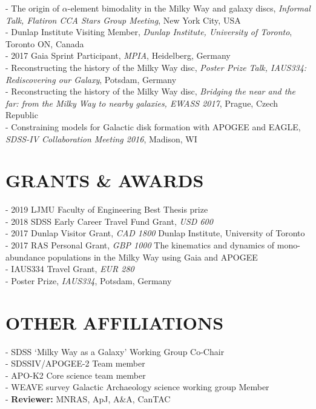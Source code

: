 \documentclass[margin]{res}
\begin{document}
\begin{resume}
- The origin of $\alpha$-element bimodality in the Milky Way and galaxy discs, \emph{Informal Talk, Flatiron CCA Stars Group Meeting}, New York City, USA\\
- Dunlap Institute Visiting Member, \emph{Dunlap Institute, University of Toronto}, Toronto ON, Canada\\
- 2017 Gaia Sprint Participant, \emph{MPIA}, Heidelberg, Germany\\
- Reconstructing the history of the Milky Way disc, \emph{Poster Prize Talk, IAUS334: Rediscovering our Galaxy}, Potsdam, Germany\\
- Reconstructing the history of the Milky Way disc, \emph{Bridging the near and the far: from the Milky Way to nearby galaxies, EWASS 2017}, Prague, Czech Republic\\
- Constraining models for Galactic disk formation with APOGEE and EAGLE, \emph{SDSS-IV Collaboration Meeting 2016}, Madison, WI\\



\section{GRANTS \& AWARDS}
\par
- 2019 LJMU Faculty of Engineering Best Thesis prize \\
- 2018 SDSS Early Career Travel Fund Grant, \emph{USD 600}\\
-  2017 Dunlap Visitor Grant, \emph{CAD 1800} Dunlap Institute, University of Toronto\\
- 2017 RAS Personal Grant, \emph{GBP 1000} The kinematics and dynamics of mono-abundance populations in the Milky Way using Gaia and APOGEE\\
- IAUS334 Travel Grant, \emph{EUR 280}\\
- Poster Prize, \emph{IAUS334}, Potsdam, Germany\\



\section{OTHER AFFILIATIONS}
\par
- SDSS `Milky Way as a Galaxy' Working Group Co-Chair \\
- SDSSIV/APOGEE-2 Team member\\
- APO-K2 Core science team member\\
- WEAVE survey Galactic Archaeology science working group Member\\
- \textbf{Reviewer:} MNRAS, ApJ, A\&A, CanTAC\\



\end{resume}
\end{document}
